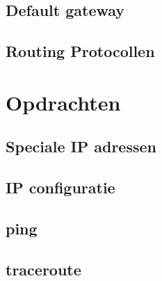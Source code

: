 \documentclass[a4paper,12pt,twoside,openright,titlepage]{book}
\begin{document}
\section{Default gateway}

\section{Routing Protocollen}


\chapter{Opdrachten}
\section{Speciale IP adressen}

\section{IP configuratie}

\section{ping}

\section{traceroute}


\printindex
\end{document}
